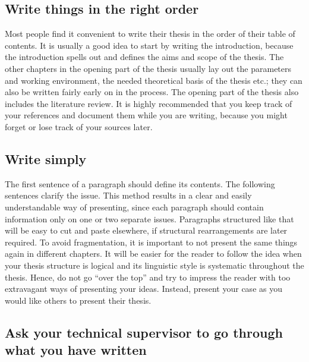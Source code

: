 \subsection{Write things in the right order}

Most people find it convenient to write their thesis in the order of
their table of contents. It is usually a good idea to start by
writing the introduction, because the introduction spells out and
defines the aims and scope of the thesis. The other chapters in the
opening part of the thesis usually lay out the parameters and working
environment, the needed theoretical basis of the thesis etc.; they
can also be written fairly early on in the process. The opening part
of the thesis also includes the literature review. It is highly
recommended that you keep track of your references and document them
while you are writing, because you might forget or lose track of your
sources later.

\subsection{Write simply}

The first sentence of a paragraph should define its contents. The
following sentences clarify the issue. This method results in a clear
and easily understandable way of presenting, since each paragraph
should contain information only on one or two separate issues.
Paragraphs structured like that will be easy to cut and paste
elsewhere, if structural rearrangements are later required. To avoid
fragmentation, it is important to not present the same things again
in different chapters. It will be easier for the reader to follow the
idea when your thesis structure is logical and its linguistic style
is systematic throughout the thesis. Hence, do not go “over the top”
and try to impress the reader with too extravagant ways of presenting
your ideas. Instead, present your case as you would like others to
present their thesis.

\subsection{Ask your technical supervisor to go through what you have written}

